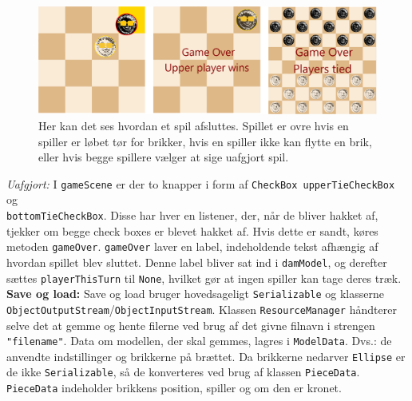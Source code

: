 \begin{figure}[H]
        \centering
        \includegraphics[width = 1.0 \textwidth]{Figurer/gameOverWinTie.pdf}
        \caption{Her kan det ses hvordan et spil afsluttes. Spillet er ovre hvis en spiller er løbet tør for brikker, hvis en spiller ikke kan flytte en brik, eller hvis begge spillere vælger at sige uafgjort spil.}
        \label{fig:gameOverWin}
    \end{figure}

\textit{Uafgjort:} I \texttt{gameScene} er der to knapper i form af \texttt{CheckBox upperTieCheckBox} og \\
\texttt{bottomTieCheckBox}. Disse har hver en listener, der, når de bliver hakket af, tjekker om begge check boxes er blevet hakket af. Hvis dette er sandt, køres metoden \texttt{gameOver}. \texttt{gameOver} laver en label, indeholdende tekst afhængig af hvordan spillet blev sluttet. Denne label bliver sat ind i \texttt{damModel}, og derefter sættes \texttt{playerThisTurn} til \texttt{None}, hvilket gør at ingen spiller kan tage deres træk. \\

\textbf{Save og load:} 
Save og load bruger hovedsageligt \texttt{Serializable} og klasserne \\
\texttt{ObjectOutputStream}/\texttt{ObjectInputStream}. Klassen \texttt{ResourceManager} håndterer selve det at gemme og hente filerne ved brug af det givne filnavn i strengen \texttt{"filename"}. Data om modellen, der skal gemmes, lagres i \texttt{ModelData}. Dvs.: de anvendte indstillinger og brikkerne på brættet. Da brikkerne nedarver \texttt{Ellipse} er de ikke \texttt{Serializable}, så de konverteres ved brug af klassen \texttt{PieceData}. \texttt{PieceData} indeholder brikkens position, spiller og om den er kronet. \\

